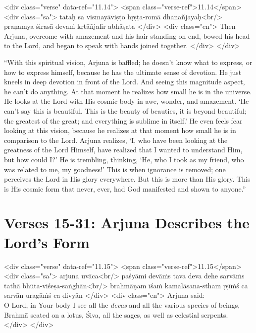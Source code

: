 \begin{html}
<div class="verse" data-ref="11.14">
  <span class="verse-ref">11.14</span>
  <div class="sa">
    tataḥ sa vismayāviṣṭo hṛṣṭa-romā dhanañjayaḥ<br/>
    praṇamya śirasā devaṁ kṛtāñjalir abhāṣata
  </div>
  <div class="en">
    Then Arjuna, overcome with amazement and his hair standing on end, bowed his head to the Lord, and began to speak with hands joined together.
  </div>
</div>
\end{html}


\enquote{With this spiritual vision, Arjuna is baffled; he doesn’t know what to express, or how to express himself, because he has the ultimate sense of devotion. He just kneels in deep devotion in front of the Lord. And seeing this magnitude aspect, he can’t do anything. At that moment he realizes how small he is in the universe. He looks at the Lord with His cosmic body in awe, wonder, and amazement. \enquote{He can’t say this is beautiful. This is the beauty of beauties, it is beyond beautiful; the greatest of the great; and everything is sublime in itself.} He even feels fear looking at this vision, because he realizes at that moment how small he is in comparison to the Lord. Arjuna realizes, \enquote{I, who have been looking at the greatness of the Lord Himself, have realized that I wanted to understand Him, but how could I?} He is trembling, thinking, \enquote{He, who I took as my friend, who was related to me, my goodness!} This is when ignorance is removed; one perceives the Lord in His glory everywhere. But this is more than His glory. This is His cosmic form that never, ever, had God manifested and shown to anyone.}


\section{Verses 15-31: Arjuna Describes the Lord's Form}\label{sec-verses-15-31-arjuna-describes-the-lord-s-form}



\begin{html}
<div class="verse" data-ref="11.15">
  <span class="verse-ref">11.15</span>
  <div class="sa">
    arjuna uvāca<br/>
    paśyāmi devāṁs tava deva dehe sarvāṁs tathā bhūta-viśeṣa-saṅghān<br/>
    brahmāṇam īśaṁ kamalāsana-stham ṛṣīṁś ca sarvān uragāṁś ca divyān
  </div>
  <div class="en">
    \hspace*{1em}Arjuna said: \\ O Lord, in Your body I see all the \textit{devas} and all the various species of beings, Brahmā seated on a lotus, Śiva, all the sages, as well as celestial serpents.
  </div>
</div>
\end{html}



